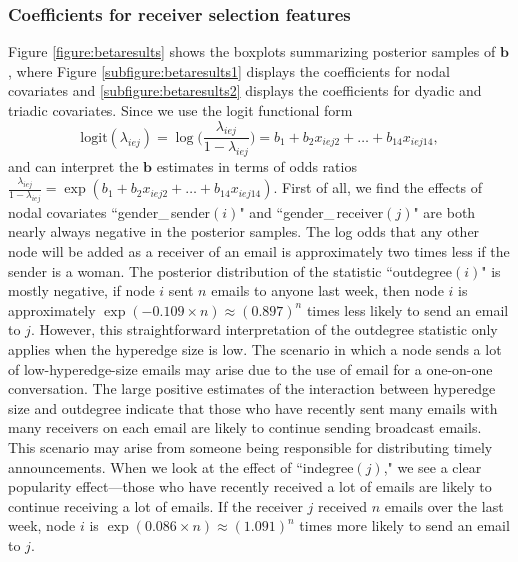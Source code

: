\documentclass[ba]{imsart}
\numberwithin{equation}{section}
\theoremstyle{plain}
\begin{document}
	\subsubsection{Coefficients for receiver selection features}
	Figure \ref{figure:betaresults} shows the boxplots summarizing posterior samples of $\boldsymbol{b}$, where Figure \ref{subfigure:betaresults1} displays the coefficients for nodal covariates and \ref{subfigure:betaresults2} displays the coefficients for dyadic and triadic covariates. Since we use the logit functional form 
	\begin{equation*}
		\mbox{logit}(\lambda_{iej})=\log\Big(\frac{\lambda_{iej}}{1-\lambda_{iej}}\Big) =b_{1}+b_{2} x_{iej2}+\ldots+b_{14}x_{iej14},
	\end{equation*}
	and can interpret the $\boldsymbol{b}$ estimates in terms of odds ratios $\frac{\lambda_{iej}}{1-\lambda_{iej}}=\exp(b_{1}+b_{2} x_{iej2}+\ldots+b_{14}x_{iej14})$. First of all, we find the effects of nodal covariates ``gender\_\,sender$(i)$" and ``gender\_\,receiver$(j)$" are both nearly always negative in the posterior samples. The log odds that any other node will be added as a receiver of an email is approximately two times less if the sender is a woman. The posterior distribution of the statistic ``outdegree$(i)$" is mostly negative, if node $i$ sent $n$ emails to anyone last week, then node $i$ is approximately $\exp(-0.109\times n)\approx(0.897)^n$ times less likely to send an email to $j$. However, this straightforward interpretation of the outdegree statistic only applies when the hyperedge size is low. The scenario in which a node sends a lot of low-hyperedge-size emails may arise due to the use of email for a one-on-one conversation. The large positive estimates of the interaction between hyperedge size and outdegree indicate that those who have recently sent many emails with many receivers on each email are likely to continue sending broadcast emails. This scenario may arise from someone being responsible for distributing timely announcements. When we look at the effect of ``indegree$(j)$," we see a clear popularity effect---those who have recently received a lot of emails are likely to continue receiving a lot of emails. If the receiver $j$ received $n$ emails over the last week, node $i$ is $\exp(0.086\times n)\approx(1.091)^n $ times more likely to send an email to $j$. 
\end{document}
